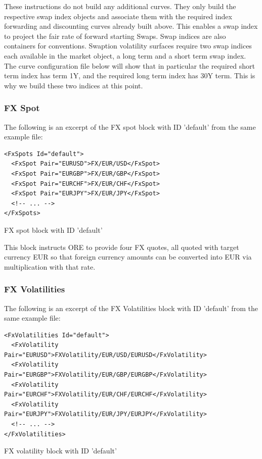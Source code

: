 \documentclass[12pt, a4paper]{article}
\begin{document}
These instructions do not build any additional curves. They only build the respective swap index objects and associate
them with the required index forwarding and discounting curves already built above. This enables a swap index to project
the fair rate of forward starting Swaps. Swap indices are also containers for conventions. Swaption volatility surfaces
require two swap indices each available in the market object, a long term and a short term swap index. The curve
configuration file below will show that in particular the required short term index has term 1Y, and the required long
term index has 30Y term. This is why we build these two indices at this point.

\subsubsection{FX Spot}

The following is an excerpt of the FX spot block with ID 'default' from the same example file:

\begin{listing}[H]
\begin{verbatim}
<FxSpots Id="default">
  <FxSpot Pair="EURUSD">FX/EUR/USD</FxSpot>
  <FxSpot Pair="EURGBP">FX/EUR/GBP</FxSpot>
  <FxSpot Pair="EURCHF">FX/EUR/CHF</FxSpot>
  <FxSpot Pair="EURJPY">FX/EUR/JPY</FxSpot>
  <!-- ... -->
</FxSpots>
\end{verbatim}
\caption{FX spot block with ID 'default'}
\label{lst:fxspot_spec}
\end{listing}

This block instructs ORE to provide four FX quotes, all quoted with target currency EUR so
that foreign currency amounts can be converted into EUR via multiplication with that rate.
 
\subsubsection{FX Volatilities}

The following is an excerpt of the FX Volatilities block with ID 'default' from the same example file:

\begin{listing}[H]
\begin{verbatim}
<FxVolatilities Id="default">
  <FxVolatility Pair="EURUSD">FXVolatility/EUR/USD/EURUSD</FxVolatility>
  <FxVolatility Pair="EURGBP">FXVolatility/EUR/GBP/EURGBP</FxVolatility>
  <FxVolatility Pair="EURCHF">FXVolatility/EUR/CHF/EURCHF</FxVolatility>
  <FxVolatility Pair="EURJPY">FXVolatility/EUR/JPY/EURJPY</FxVolatility>
  <!-- ... -->
</FxVolatilities>
\end{verbatim}
\caption{FX volatility block with ID 'default'}
\label{lst:fxvol_spec}
\end{listing}
\end{document}
